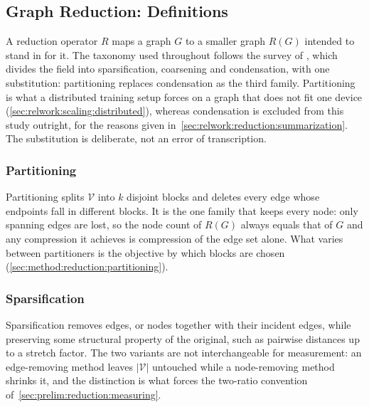 \subsection{Graph Reduction: Definitions}
\label{sec:prelim:reduction}
A reduction operator $R$ maps a graph $G$ to a smaller graph $R(G)$ intended to stand in
for it. The taxonomy used throughout follows the survey of \citet{hashemi2024survey},
which divides the field into sparsification, coarsening and condensation, with one
substitution: partitioning replaces condensation as the third family. Partitioning is
what a distributed training setup forces on a graph that does not fit one device
(\ref{sec:relwork:scaling:distributed}), whereas condensation is excluded from this study
outright, for the reasons given in~\ref{sec:relwork:reduction:summarization}. The
substitution is deliberate, not an error of transcription.

\subsubsection{Partitioning}
\label{sec:prelim:reduction:partitioning}
Partitioning splits $\mathcal{V}$ into $k$ disjoint blocks and deletes every edge whose
endpoints fall in different blocks. It is the one family that keeps every node: only
spanning edges are lost, so the node count of $R(G)$ always equals that of $G$ and any
compression it achieves is compression of the edge set alone. What varies between
partitioners is the objective by which blocks are chosen
(\ref{sec:method:reduction:partitioning}).

\subsubsection{Sparsification}
\label{sec:prelim:reduction:sparsification}
Sparsification removes edges, or nodes together with their incident edges, while
preserving some structural property of the original, such as pairwise distances up to a
stretch factor. The two variants are not interchangeable for measurement: an edge-removing
method leaves $|\mathcal{V}|$ untouched while a node-removing method shrinks it, and the
distinction is what forces the two-ratio convention
of~\ref{sec:prelim:reduction:measuring}.

